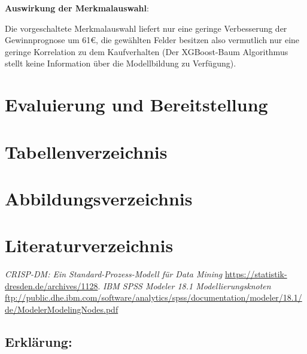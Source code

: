 \documentclass[a4paper,12pt]{article}
\newcounter{Algorithmus}
\begin{document}
{\bf Auswirkung der Merkmalauswahl}:
\par
Die vorgeschaltete Merkmalauswahl liefert nur eine geringe Verbesserung der Gewinnprognose um 61\;\euro, die gewählten Felder besitzen also vermutlich nur eine geringe Korrelation zu dem Kaufverhalten (Der XGBoost-Baum Algorithmus stellt keine Information über die Modellbildung zu Verfügung).
\section{Evaluierung und Bereitstellung}

\newpage
\section{Tabellenverzeichnis}
\listoftables 


\newpage
\section{Abbildungsverzeichnis}
\listoffigures
{}
\newpage

\newpage
\section{Literaturverzeichnis}
\thispagestyle{plain}
\begin{thebibliography}{DiplRS}
 {\it CRISP-DM: Ein Standard-Prozess-Modell für Data Mining} \url{ https://statistik-dresden.de/archives/1128}.
 {\it IBM SPSS Modeler 18.1 Modellierungsknoten} 
\url{ftp://public.dhe.ibm.com/software/analytics/spss/documentation/modeler/18.1/de/ModelerModelingNodes.pdf}
\end{thebibliography}

\newpage
\begin{titlepage}
\section*{Erklärung:}

\vfill
\end{titlepage}
\end{document}
